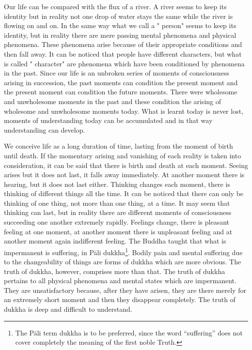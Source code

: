 \documentclass{book}
\begin{document}
Our life can be compared with the flux of a river. A river seems to keep
its identity but in reality not one drop of water stays the same while
the river is flowing on and on. In the same way what we call a " person"
seems to keep its identity, but in reality there are mere passing mental
phenomena and physical phenomena. These phenomena arise because of their
appropriate conditions and then fall away. It can be noticed that people
have different charac­ters, but what is called " character" are
phenomena which have been conditioned by phenomena in the past. Since
our life is an unbroken series of moments of conscious­ness arising in
succession, the past moments can condition the present moment and the
present moment can condition the future moments. There were wholesome
and unwholesome moments in the past and these condi­tion the arising of
wholesome and unwhole­some moments today. What is learnt today is never
lost, moments of understanding today can be accumulated and in that way
understanding can develop.

We conceive life as a long duration of time, lasting from the moment of
birth until death. If the momentary arising and vanishing of each
reality is taken into consideration, it can be said that there is birth
and death at each moment. Seeing arises but it does not last, it falls
away imme­diately. At another moment there is hearing, but it does not
last either. Thinking changes each moment, there is thinking of
different things all the time. It can be noticed that there can only be
thinking of one thing, not more than one thing, at a time. It may seem
that thinking can last, but in reality there are different moments of
con­sciousness succeeding one another extremely rapidly. Feelings
change, there is pleasant feeling at one moment, at another moment there
is unpleasant feeling and at another moment again indifferent feeling.
The Buddha taught that what is impermanent is suffering, in Pāli
dukkha\footnote{The Pāli term dukkha is to be preferred, since the word
  ``suffering'' does not cover completely the meaning of the first noble
  Truth.}. Bodily pain and mental suffering due to the changeability of
things are forms of dukkha which are more obvious. The truth of dukkha,
however, comprises more than that. The truth of dukkha pertains to all
physical phenomena and mental states which are imper­manent. They are
unsatisfactory because, after they have arisen, they are there merely
for an extremely short moment and then they disappear completely. The
truth of dukkha is deep and difficult to understand.
\end{document}
